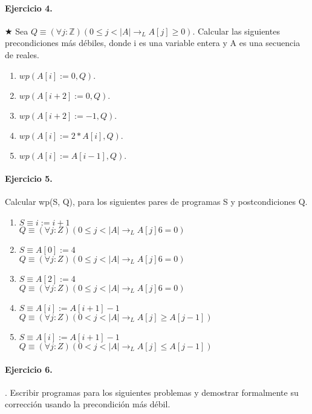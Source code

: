\documentclass[a4paper]{article}
\begin{document}
\paragraph{Ejercicio 4.} $\bigstar$ Sea $Q \equiv (\forall j :\mathbb{Z})(0 \leq j < |A| \rightarrow_L
 A[j] \geq 0)$. Calcular las 
siguientes precondiciones más débiles, donde i es
una variable entera y A es una secuencia de reales.

\begin{enumerate}[label=\alph*)]
\item $wp(A[i] := 0, Q).$
\item $wp(A[i+2] := 0, Q).$
\item $wp(A[i+2] := -1, Q).$
\item $wp(A[i] := 2 * A[i], Q).$
\item $wp(A[i] := A[i-1], Q).$
\end{enumerate}

\paragraph{Ejercicio 5.} Calcular wp(S, Q), para los siguientes pares de programas S y postcondiciones Q.

\begin{enumerate}[label=\alph*)]
\item $S \equiv i := i + 1$\\
  $Q \equiv (\forall j :Z)(0 \leq j < |A| \rightarrow_L A[j] 6= 0)$
\item $S \equiv A[0] := 4$\\
   $Q \equiv (\forall j :Z)(0 \leq j < |A| \rightarrow_L A[j] 6= 0)$
\item $S \equiv A[2] := 4$\\
   $Q \equiv (\forall j :Z)(0 \leq j < |A| \rightarrow_L A[j] 6= 0)$
\item $S \equiv A[i] := A[i+1] - 1$\\
   $Q \equiv (\forall j :Z)(0 < j < |A| \rightarrow_L A[j] \geq A[j - 1])$
\item $S \equiv A[i] := A[i+1] - 1$\\
   $Q \equiv (\forall j :Z)(0 < j < |A| \rightarrow_L A[j] \leq A[j - 1])$
\end{enumerate}

\paragraph{Ejercicio 6.}. Escribir programas para los siguientes problemas y demostrar 
formalmente su corrección usando la precondición
más débil.
\end{document}
